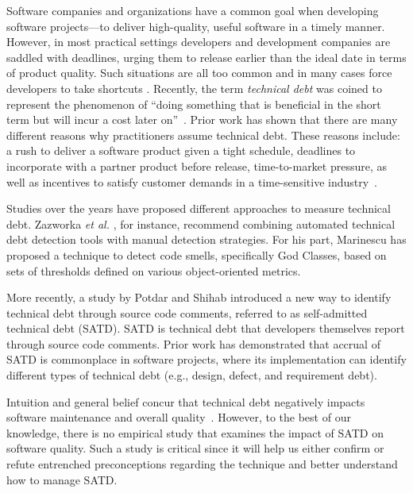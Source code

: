 
Software companies and organizations have a common goal when developing software projects---to deliver high-quality, useful software in a timely manner. However, in most practical settings developers and development companies are saddled with deadlines, urging them to release earlier than the ideal date in terms of product quality. Such situations are all too common and in many cases force developers to take shortcuts \cite{kruchten2013technical} \cite{seaman2015technical}. Recently, the term \emph{technical debt} was coined to represent the phenomenon of ``doing something that is beneficial in the short term but will incur a cost later on''~\cite{cunningham1993wycash}. Prior work has shown that there are many different reasons why practitioners assume technical debt. These reasons include: a rush to deliver a software product given a tight schedule, deadlines to incorporate with a partner product before release, time-to-market pressure, as well as incentives to satisfy customer demands in a time-sensitive industry~\cite{lim2012balancing}.

Studies over the years have proposed different approaches to measure technical debt. Zazworka \textit{et al.} \cite{zazworka2011investigating}, for instance, recommend combining automated technical debt detection tools with manual detection strategies. For his part, Marinescu \cite{marinescu2004detection} has proposed a technique to detect code smells, specifically God Classes, based on sets of thresholds defined on various object-oriented metrics.

More recently, a study by Potdar and Shihab \cite{ICSM_PotdarS14} introduced a new way to identify technical debt through source code comments, referred to as self-admitted technical debt (SATD). SATD is technical debt that developers themselves report through source code comments. Prior work \cite{MTD15p9} has demonstrated that accrual of SATD is commonplace in software projects, where its implementation can identify different types of technical debt (e.g., design, defect, and requirement debt).\par

Intuition and general belief concur that technical debt negatively impacts software maintenance and overall quality~\cite{zazworka2011investigating,spinola2013investigating,GuoSGCTSSS11,seaman2015technical,kruchten2013technical}. However, to the best of our knowledge, there is no empirical study that examines the impact of SATD on software quality. Such a study is critical since it will help us either confirm or refute entrenched preconceptions regarding the technique and better understand how to manage SATD.\par

